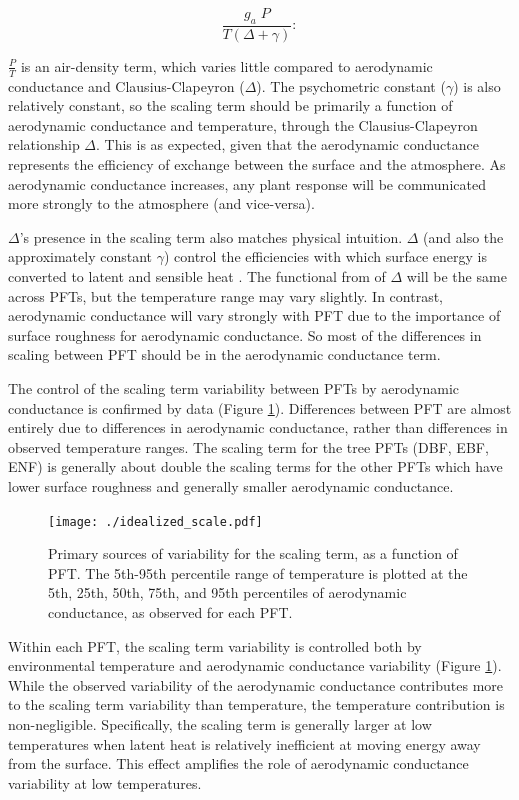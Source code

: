 \documentclass[draft,linenumbers]{agujournal}
\begin{document}
\begin{equation}
  \frac{g_a \; P}{T(\Delta + \gamma)}:
\end{equation}

$\frac{P}{T}$ is an air-density term, which varies little compared to aerodynamic conductance and Clausius-Clapeyron ($\Delta$). The psychometric constant ($\gamma$) is also relatively constant, so the scaling term should be primarily a function of aerodynamic conductance and temperature, through the Clausius-Clapeyron relationship $\Delta$. This is as expected, given that the aerodynamic conductance represents the efficiency of exchange between the surface and the atmosphere. As aerodynamic conductance  increases, any plant response will be communicated more strongly to the atmosphere (and vice-versa).

$\Delta$'s presence in the scaling term also matches physical intuition. $\Delta$ (and also the approximately constant $\gamma$) control the efficiencies with which surface energy is converted to latent and sensible heat \citep{Monteith_1965}. The functional from of $\Delta$ will be the same across PFTs, but the temperature range may vary slightly. In contrast, aerodynamic conductance will vary strongly with PFT due to the importance of surface roughness for aerodynamic conductance. So most of the differences in scaling between PFT should be in the aerodynamic conductance term. 

The control of the scaling term variability between PFTs by aerodynamic conductance is confirmed by data (Figure \ref{scale_vary}). Differences between PFT are almost entirely due to differences in aerodynamic conductance, rather than differences in observed temperature ranges. The scaling term for the tree PFTs (DBF, EBF, ENF) is generally about double the scaling terms for the other PFTs which have lower surface roughness and generally smaller aerodynamic conductance.

\begin{figure}
\centerline{\texttt{[image: ./idealized\_scale.pdf]}}
\caption{Primary sources of variability for the scaling term, as a function of PFT. The 5th-95th percentile range of temperature is plotted at the 5th, 25th, 50th, 75th, and 95th percentiles of aerodynamic conductance, as observed for each PFT.}
\label{scale_vary}
\end{figure}

Within each PFT, the scaling term variability is controlled both by environmental temperature and aerodynamic conductance variability (Figure \ref{scale_vary}). While the observed variability of the aerodynamic conductance contributes more to the scaling term variability than temperature, the temperature contribution is non-negligible. Specifically, the scaling term is generally larger at low temperatures when latent heat is relatively inefficient at moving energy away from the surface. This effect amplifies the role of aerodynamic conductance variability at low temperatures.
\end{document}
